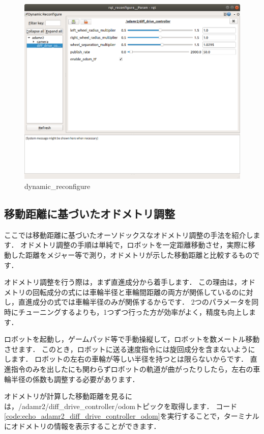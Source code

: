 \documentclass[{../../master}]{subfiles}
\begin{document}
\begin{figure}[ht]
  \centering
  \includegraphics[height=100truemm]{images/dynamic_reconfigure.png}
  \caption{\textsf{dynamic\_reconfigure}}
  \label{fig:dynamic_reconfigure}
\end{figure}

\subsection{移動距離に基づいたオドメトリ調整}

ここでは移動距離に基づいたオーソドックスなオドメトリ調整の手法を紹介します．
オドメトリ調整の手順は単純で，ロボットを一定距離移動させ，実際に移動した距離をメジャー等で測り，オドメトリが示した移動距離と比較するものです．

オドメトリ調整を行う際は，まず直進成分から着手します．
この理由は，オドメトリの回転成分の式には車輪半径と車輪間距離の両方が関係しているのに対し，直進成分の式では車輪半径のみが関係するからです．
2つのパラメータを同時にチューニングするよりも，1つずつ行った方が効率がよく，精度も向上します．

ロボットを起動し，ゲームパッド等で手動操縦して，ロボットを数メートル移動させます．
このとき，ロボットに送る速度指令には旋回成分を含まないようにします．
ロボットの左右の車輪が等しい半径を持つとは限らないからです．
直進指令のみを出したにも関わらずロボットの軌道が曲がったりしたら，左右の車輪半径の係数も調整する必要があります．

オドメトリが計算した移動距離を見るには，\textsf{/adamr2/diff\_drive\_controller/odom}トピックを取得します．
コード\ref{code:echo_adamr2_diff_drive_controller_odom}を実行することで，ターミナルにオドメトリの情報を表示することができます．
\end{document}
